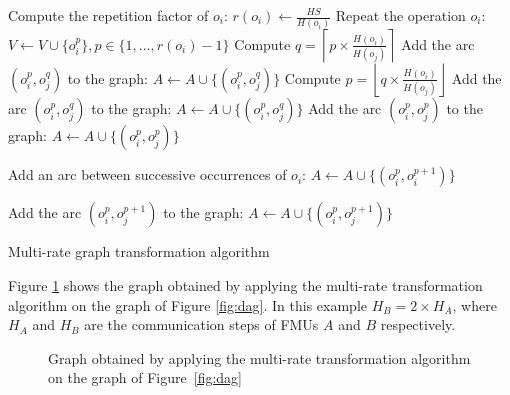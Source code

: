 \begin{algorithm}[!htp]
		{
			Compute the repetition factor of $o_i$: $r(o_i) \leftarrow \frac{HS}{H(o_i)}$\;
			Repeat the operation $o_i$: $V \leftarrow V \cup \{o_i^p\}, p \in \{1, \dots,r(o_i)-1\}$\;
		}
		{
			{
					{
						Compute $q = \left \lceil{p \times \frac{H(o_i)}{H(o_j)}}\right \rceil$\;
						Add the arc $(o_i^p,o_j^q)$ to the graph: $A \leftarrow A \cup \{(o_i^p,o_j^q)\}$\;
					}
			}
			{
					{
						Compute $p = \left \lfloor{q \times \frac{H(o_i)}{H(o_j)}}\right \rfloor$\;
						Add the arc $(o_i^p,o_j^q)$ to the graph: $A \leftarrow A \cup \{(o_i^p,o_j^q)\}$\;
					}
			}
			\Else
			{
					{
					  Add the arc $(o_i^p,o_j^p)$ to the graph: $A \leftarrow A \cup \{(o_i^p,o_j^p)\}$\;
					}
			}
		}
		{
			{
				 Add an arc between successive occurrences of $o_i$: $A \leftarrow A \cup \{(o_i^p,o_i^{p+1})\}$\;
			}
			
		}
		{
					{
						{
							Add the arc $(o_i^p,o_j^{p+1})$ to the graph: $A \leftarrow A \cup \{(o_i^p,o_j^{p+1})\}$\;
						}
					
					}
		}
	\caption{Multi-rate graph transformation algorithm}
	\label{algo:mr}
\end{algorithm}

Figure \ref{fig:dagmr} shows the graph obtained by applying the multi-rate transformation algorithm on the graph of Figure \ref{fig:dag}. In this example $H_B = 2 \times H_A$, where $H_A$ and $H_B$ are the communication steps of FMUs $A$ and $B$ respectively.

\begin{figure}[htb]
\captionsetup{justification=centering}
\centering
  
\caption{Graph obtained by applying the multi-rate transformation algorithm on the graph of Figure~\ref{fig:dag}}
\label{fig:dagmr}
\end{figure}

